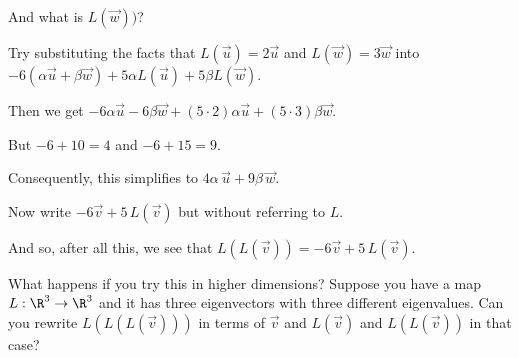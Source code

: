 \documentclass{ximera}
\begin{document}
\begin{question}
\begin{solution}
    \begin{hint}
      \begin{question}
        \begin{solution}
          And what is $L(\vec{w}))$?

          \begin{multiple-choice}
          \end{multiple-choice} 
        \end{solution}
      \end{question}
    \end{hint}

    \begin{hint}
      Try substituting the facts that $L(\vec{u}) = 2 \vec{u}$ and $L(\vec{w}) = 3 \vec{w}$ into $-6 \left( \alpha \vec{u} + \beta \vec{w} \right) + 5 \alpha L(\vec{u}) + 5 \beta L(\vec{w})$.
    \end{hint}    

    \begin{hint}
      Then we get $-6 \alpha \vec{u} - 6 \beta \vec{w} + (5 \cdot 2) \alpha \vec{u} + (5 \cdot 3) \beta \vec{w}$.
    \end{hint}    

    \begin{hint}
      But $-6 + 10 = 4$ and $-6 + 15 = 9$.
    \end{hint}    

    \begin{hint}
      Consequently, this simplifies to $4\alpha\,\vec{u} + 9\beta\,\vec{w}$.
    \end{hint}    

    Now write $-6 \vec{v} + 5 \, L(\vec{v})$ but without referring to $L$.
    \begin{multiple-choice}
    \end{multiple-choice} 
  \end{solution}

  And so, after all this, we see that $L(L(\vec{v})) = -6 \vec{v} + 5 \, L(\vec{v})$.

  What happens if you try this in higher dimensions?  Suppose you have
  a map $L : \R^3 \to \R^3$ and it has three eigenvectors with three
  different eigenvalues.  Can you rewrite $L(L(L(\vec{v})))$ in terms
  of $\vec{v}$ and $L(\vec{v})$ and $L(L(\vec{v}))$ in that case?

\end{question}
\end{document}
